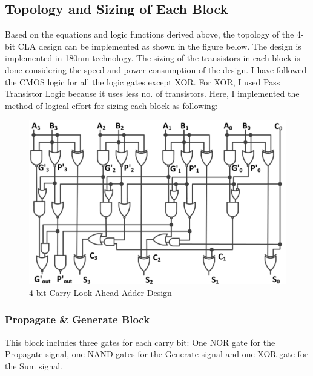 \documentclass[conference]{IEEEtran}
\begin{document}

\subsection{Topology and Sizing of Each Block}
\noindent
Based on the equations and logic functions derived above, the topology of the 4-bit CLA design can be implemented as shown in the figure below. The design is implemented in 180nm technology. The sizing of the transistors in each block is done considering the speed and power consumption of the design. I have followed the CMOS logic for all the logic gates except XOR. For XOR, I used Pass Transistor Logic because it uses less no. of transistors. Here, I implemented the method of logical effort for sizing each block as following:

\begin{figure}[H]
    \centering
    \includegraphics[width=1\linewidth]{Circuit_Diagram.png}
    \caption{4-bit Carry Look-Ahead Adder Design}
    \label{fig:cla}
    \end{figure}

\subsubsection{Propagate \& Generate Block}
This block includes three gates for each carry bit: One NOR gate for the Propagate signal, one NAND gates for the Generate signal and one XOR gate for the Sum signal.
\end{document}
